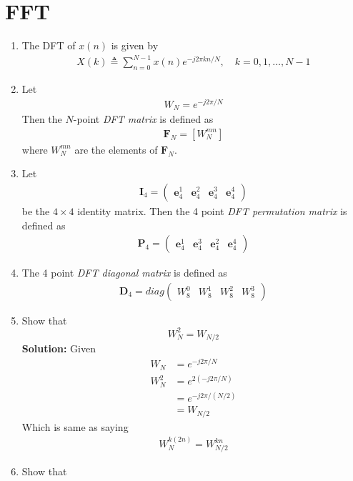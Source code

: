\documentclass[journal,12pt,twocolumn]{IEEEtran}
\newcommand{\solution}{\noindent \textbf{Solution: }}
\providecommand{\brak}[1]{\ensuremath{\left(#1\right)}}
\providecommand{\sbrak}[1]{\ensuremath{\left[#1\right]}}
\let\vec\mathbf
\numberwithin{equation}{section}
\renewcommand\thesection{\arabic{section}}
\newcommand{\myvec}[1]{\ensuremath{\begin{pmatrix}#1\end{pmatrix}}}
\begin{document}
	\section{FFT}	
\begin{enumerate}[label=\arabic*.,ref=\thesection.\theenumi]
    \item The DFT of $x(n)$ is given by
    \begin{align}
        X(k) \triangleq \sum_{n=0}^{N-1} x(n) e^{-j 2 \pi k n / N}, \quad k=0,1, \ldots, N-1
    \end{align}
\item Let 
	\begin{align}
W_{N} = e^{-j2\pi/N} 
	\end{align}
		Then the $N$-point {\em DFT matrix} is defined as 
	\begin{align}
		\vec{F}_{N} = \sbrak{W_{N}^{mn}}
	\end{align}
	where $W_{N}^{mn}$ are the elements of $\vec{F}_{N}$.
\item Let 
	\begin{align}
		\vec{I}_4 = \myvec{\vec{e}_4^{1} &\vec{e}_4^{2} &\vec{e}_4^{3} &\vec{e}_4^{4} }
	\end{align}
		be the $4\times 4$ identity matrix.  Then the 4 point {\em DFT permutation matrix} is defined as 
	\begin{align}
		\vec{P}_4 = \myvec{\vec{e}_4^{1} &\vec{e}_4^{3} &\vec{e}_4^{2} &\vec{e}_4^{4} }
	\end{align}
\item The 4 point {\em DFT diagonal matrix} is defined as 
	\begin{align}
		\vec{D}_4 = diag\myvec{W_{8}^{0} & W_{8}^{1} & W_{8}^{2} & W_{8}^{3}}
	\end{align}
\item Show that 
\begin{equation}
    W_{N}^{2}=W_{N/2}
\end{equation}
\solution Given
\begin{align}
W_{N} &= e^{-j2\pi/N}\\
 W_{N}^{2}&=e^{2\brak{-j2\pi/N}}\\
 &=e^{-j2\pi/\brak{N/2}}\\
 &=W_{N/2}
\end{align}
Which is same as saying 
\begin{align}
\label{eq:halving}
W_N^{k\brak{2n}}=W_{N/2}^{kn}
\end{align}
     \item Show that 

\end{enumerate}
\end{document}

